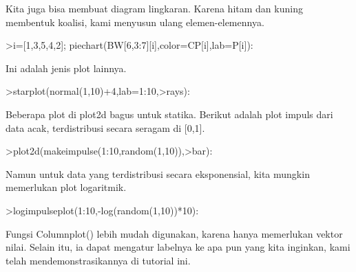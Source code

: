 \documentclass[a4paper,10pt]{article}
\begin{document}
\begin{eulernotebook}
\begin{eulercomment}
\begin{eulercomment}
\begin{eulercomment}
Kita juga bisa membuat diagram lingkaran. Karena hitam dan kuning
membentuk koalisi, kami menyusun ulang elemen-elemennya.
\end{eulercomment}
\begin{eulerprompt}
>i=[1,3,5,4,2]; piechart(BW[6,3:7][i],color=CP[i],lab=P[i]):
\end{eulerprompt}
\begin{eulercomment}
Ini adalah jenis plot lainnya.
\end{eulercomment}
\begin{eulerprompt}
>starplot(normal(1,10)+4,lab=1:10,>rays):
\end{eulerprompt}
\begin{eulercomment}
Beberapa plot di plot2d bagus untuk statika. Berikut adalah plot
impuls dari data acak, terdistribusi secara seragam di [0,1].
\end{eulercomment}
\begin{eulerprompt}
>plot2d(makeimpulse(1:10,random(1,10)),>bar):
\end{eulerprompt}
\begin{eulercomment}
Namun untuk data yang terdistribusi secara eksponensial, kita mungkin
memerlukan plot logaritmik.
\end{eulercomment}
\begin{eulerprompt}
>logimpulseplot(1:10,-log(random(1,10))*10):
\end{eulerprompt}
\begin{eulercomment}
Fungsi Columnplot() lebih mudah digunakan, karena hanya memerlukan
vektor nilai. Selain itu, ia dapat mengatur labelnya ke apa pun yang
kita inginkan, kami telah mendemonstrasikannya di tutorial ini.


\end{eulercomment}
\end{eulercomment}
\end{eulercomment}
\end{eulernotebook}
\end{document}
